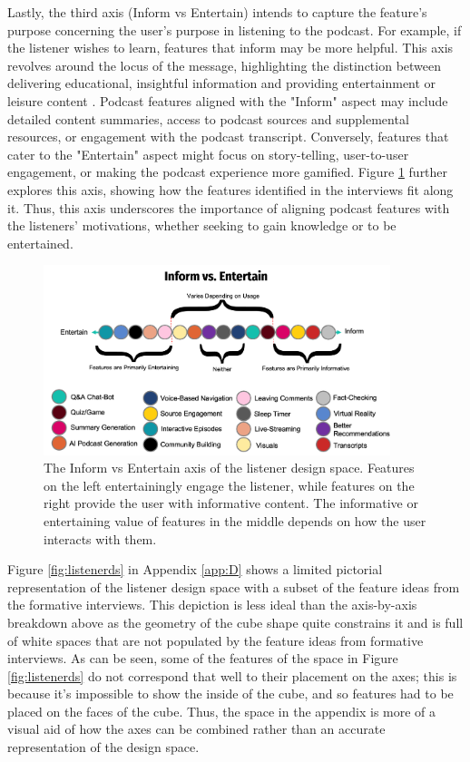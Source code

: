 \documentclass[12pt]{report}
\begin{document}
\begin{myfont}
        Lastly, the third axis (Inform vs Entertain) intends to capture the feature's purpose concerning the user's purpose in listening to the podcast. For example, if the listener wishes to learn, features that inform may be more helpful. This axis revolves around the locus of the message, highlighting the distinction between delivering educational, insightful information and providing entertainment or leisure content \citep{Sundar2010Designing}. Podcast features aligned with the "Inform" aspect may include detailed content summaries, access to podcast sources and supplemental resources, or engagement with the podcast transcript. Conversely, features that cater to the "Entertain" aspect might focus on story-telling, user-to-user engagement, or making the podcast experience more gamified. Figure \ref{fig:informvsentertain} further explores this axis, showing how the features identified in the interviews fit along it. Thus, this axis underscores the importance of aligning podcast features with the listeners' motivations, whether seeking to gain knowledge or to be entertained. 

        \begin{figure}[H]
            \centering
              \includegraphics[width=0.9\textwidth]{figures/informvsentertain.png}
              \caption{The Inform vs Entertain axis of the listener design space. Features on the left entertainingly engage the listener, while features on the right provide the user with informative content. The informative or entertaining value of features in the middle depends on how the user interacts with them.}
              \label{fig:informvsentertain}
        \end{figure}

        \indent Figure \ref{fig:listenerds} in Appendix \ref{app:D} shows a limited pictorial representation of the listener design space with a subset of the feature ideas from the formative interviews. This depiction is less ideal than the axis-by-axis breakdown above as the geometry of the cube shape quite constrains it and is full of white spaces that are not populated by the feature ideas from formative interviews. As can be seen, some of the features of the space in Figure \ref{fig:listenerds} do not correspond that well to their placement on the axes; this is because it's impossible to show the inside of the cube, and so features had to be placed on the faces of the cube. Thus, the space in the appendix is more of a visual aid of how the axes can be combined rather than an accurate representation of the design space.
        

\end{myfont}
\end{document}
